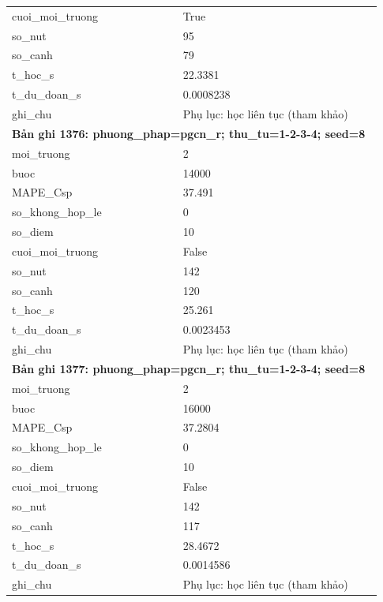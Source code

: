 \begin{longtable}{p{0.43\linewidth}p{0.50\linewidth}}
cuoi\_\allowbreak moi\_\allowbreak truong & True \\
so\_\allowbreak nut & 95 \\
so\_\allowbreak canh & 79 \\
t\_\allowbreak hoc\_\allowbreak s & 22.3381 \\
t\_\allowbreak du\_\allowbreak doan\_\allowbreak s & 0.0008238 \\
ghi\_\allowbreak chu & Phụ lục: học liên tục (tham khảo) \\
\midrule
\multicolumn{2}{p{0.95\linewidth}}{\textbf{Bản ghi 1376: phuong\_phap=pgcn\_r; thu\_tu=1-2-3-4; seed=8}} \\
moi\_\allowbreak truong & 2 \\
buoc & 14000 \\
MAPE\_\allowbreak Csp & 37.491 \\
so\_\allowbreak khong\_\allowbreak hop\_\allowbreak le & 0 \\
so\_\allowbreak diem & 10 \\
cuoi\_\allowbreak moi\_\allowbreak truong & False \\
so\_\allowbreak nut & 142 \\
so\_\allowbreak canh & 120 \\
t\_\allowbreak hoc\_\allowbreak s & 25.261 \\
t\_\allowbreak du\_\allowbreak doan\_\allowbreak s & 0.0023453 \\
ghi\_\allowbreak chu & Phụ lục: học liên tục (tham khảo) \\
\midrule
\multicolumn{2}{p{0.95\linewidth}}{\textbf{Bản ghi 1377: phuong\_phap=pgcn\_r; thu\_tu=1-2-3-4; seed=8}} \\
moi\_\allowbreak truong & 2 \\
buoc & 16000 \\
MAPE\_\allowbreak Csp & 37.2804 \\
so\_\allowbreak khong\_\allowbreak hop\_\allowbreak le & 0 \\
so\_\allowbreak diem & 10 \\
cuoi\_\allowbreak moi\_\allowbreak truong & False \\
so\_\allowbreak nut & 142 \\
so\_\allowbreak canh & 117 \\
t\_\allowbreak hoc\_\allowbreak s & 28.4672 \\
t\_\allowbreak du\_\allowbreak doan\_\allowbreak s & 0.0014586 \\
ghi\_\allowbreak chu & Phụ lục: học liên tục (tham khảo) \\

\end{longtable}
